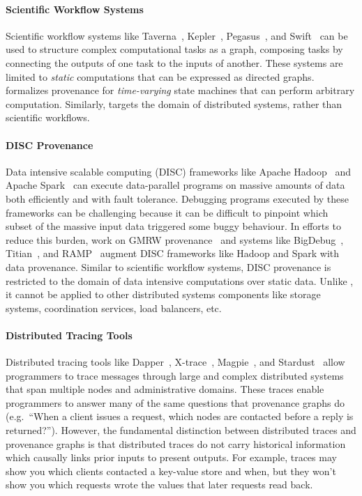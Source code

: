 \paragraph{Scientific Workflow Systems}
Scientific workflow systems like Taverna~\cite{wolstencroft2013taverna},
Kepler~\cite{altintas2006provenance}, Pegasus~\cite{kim2008provenance}, and
Swift~\cite{wozniak2013swift} can be used to structure complex computational
tasks as a graph, composing tasks by connecting the outputs of one task to the
inputs of another. These systems are limited to \emph{static} computations that
can be expressed as directed graphs. \watprovenance{} formalizes provenance for
\emph{time-varying} state machines that can perform arbitrary computation.
Similarly, \fluent{} targets the domain of distributed systems, rather than
scientific workflows.

\paragraph{DISC Provenance}
Data intensive scalable computing (DISC) frameworks like Apache
Hadoop~\cite{shvachko2010hadoop} and Apache Spark~\cite{zaharia2010spark} can
execute data-parallel programs on massive amounts of data both efficiently and
with fault tolerance. Debugging programs executed by these frameworks can be
challenging because it can be difficult to pinpoint which subset of the massive
input data triggered some buggy behaviour. In efforts to reduce this burden,
work on GMRW provenance~\cite{ikeda2011provenance} and systems like
BigDebug~\cite{gulzar2016bigdebug}, Titian~\cite{interlandi2015titian}, and
RAMP~\cite{park2011ramp} augment DISC frameworks like Hadoop and Spark with
data provenance. Similar to scientific workflow systems, DISC provenance is
restricted to the domain of data intensive computations over static data.
Unlike \watprovenance{}, it cannot be applied to other distributed systems
components like storage systems, coordination services, load balancers, etc.

\paragraph{Distributed Tracing Tools}
Distributed tracing tools like Dapper~\cite{sigelman2010dapper},
X-trace~\cite{fonseca2007x}, Magpie~\cite{barham2003magpie}, and
Stardust~\cite{thereska2006stardust} allow programmers to trace messages
through large and complex distributed systems that span multiple nodes and
administrative domains. These traces enable programmers to answer many of the
same questions that provenance graphs do (e.g.\ ``When a client issues a
request, which nodes are contacted before a reply is returned?''). However, the
fundamental distinction between distributed traces and provenance graphs is
that distributed traces do not carry historical information which causally
links prior inputs to present outputs. For example, traces may show you which
clients contacted a key-value store and when, but they won't show you which
requests wrote the values that later requests read back.

